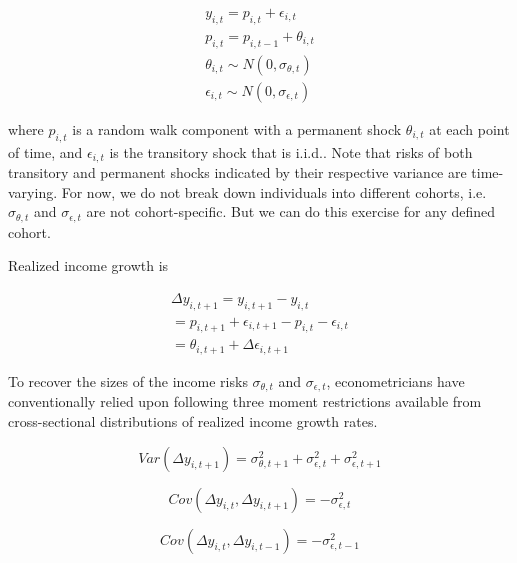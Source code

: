 \documentclass[12pt,notitlepage,onecolumn,aps,pra]{article}
\begin{document}
\begin{equation}
\begin{split}
y_{i,t} = p_{i,t} + \epsilon_{i,t} \\
p_{i,t} = p_{i,t-1} + \theta_{i,t} \\
\theta_{i,t} \sim N(0,\sigma_{\theta,t}) \\
\epsilon_{i,t} \sim N(0,\sigma_{\epsilon,t})
\end{split}
\end{equation}

where \(p_{i,t}\) is a random walk component with a permanent shock
\(\theta_{i,t}\) at each point of time, and \(\epsilon_{i,t}\) is the
transitory shock that is i.i.d.. Note that risks of both transitory and
permanent shocks indicated by their respective variance are
time-varying. For now, we do not break down individuals into different
cohorts, i.e. \(\sigma_{\theta,t}\) and \(\sigma_{\epsilon,t}\) are not
cohort-specific. But we can do this exercise for any defined cohort.

Realized income growth is

\begin{equation}
\begin{split}
\Delta y_{i,t+1} = y_{i,t+1} - y_{i,t} \\
 = p_{i,t+1} + \epsilon_{i,t+1} - p_{i,t} - \epsilon_{i,t} \\
 = \theta_{i,t+1} + \Delta \epsilon_{i,t+1}
\end{split}
\end{equation}

To recover the sizes of the income risks \(\sigma_{\theta,t}\) and
\(\sigma_{\epsilon,t}\), econometricians have conventionally relied upon
following three moment restrictions available from cross-sectional
distributions of realized income growth rates.

\begin{equation}
\label{VarUC}
Var (\Delta y_{i,t+1}) =  \sigma^2_{\theta,t+1} +\sigma^2_{\epsilon,t}+ \sigma^2_{\epsilon,t+1}
\end{equation}

\begin{equation}
\label{AvarUC1}
Cov (\Delta y_{i,t}, \Delta y_{i,t+1}) =  - \sigma^2_{\epsilon,t}
\end{equation}

\begin{equation}
\label{AvarUC2}
Cov (\Delta y_{i,t}, \Delta y_{i,t-1}) =  - \sigma^2_{\epsilon,t-1}
\end{equation}
\end{document}
